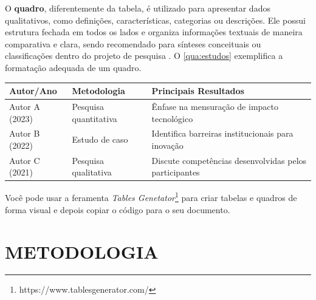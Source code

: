 


O \textbf{quadro}, diferentemente da tabela, é utilizado para apresentar dados qualitativos, como definições, características, categorias ou descrições. Ele possui estrutura fechada em todos os lados e organiza informações textuais de maneira comparativa e clara, sendo recomendado para sínteses conceituais ou classificações dentro do projeto de pesquisa \cite{ABNT_NBR14724_2011,ABNT_NBR15287_2011,ABNT_NBR6024_2012}. O \autoref{qua:estudos} exemplifica a formatação adequada de um quadro.

\begin{quadro}[htbp]  %
    \centering
    \caption{Exemplo de quadro}
    \label{qua:estudos}
    \begin{tabular}{|p{3cm}|p{4cm}|p{6cm}|} %
        \hline
        \textbf{Autor/Ano} & \textbf{Metodologia} & \textbf{Principais Resultados} \\
        \hline
        Autor A (2023) & Pesquisa quantitativa & Ênfase na mensuração de impacto tecnológico \\ \hline
        Autor B (2022) & Estudo de caso & Identifica barreiras institucionais para inovação \\ \hline
        Autor C (2021) & Pesquisa qualitativa & Discute competências desenvolvidas pelos participantes \\ \hline
    \end{tabular}
\end{quadro}

Você pode usar a feramenta \textit{Tables Genetator}\footnote{https://www.tablesgenerator.com/} para criar tabelas e quadros de forma visual e depois copiar o código para o seu documento.

\section{METODOLOGIA}
\label{sec:metodologia}

